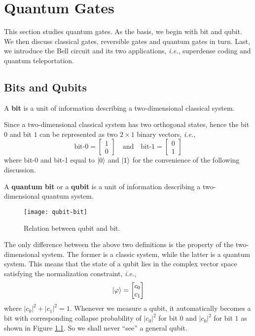 \documentclass{easyclass}
\begin{document}
\else
	\chapter{Quantum Gates}
\fi

This section studies quantum gates. As the basis, we begin with bit and qubit. We then discuss classical gates, reversible gates and quantum gates in turn. Last, we introduce the Bell circuit and its two applications, \textit{i.e.}, superdense coding and quantum teleportation.

\section{Bits and Qubits}
\label{sec:bits-and-qubits}
\begin{definition}[Bit]
	A \textbf{bit} is a unit of information describing a two-dimensional classical
	system.
\end{definition}

Since a two-dimensional classical system has two orthogonal states, hence the bit $0$ and bit $1$ can be represented as two $2\times 1$ binary vectors, \textit{i.e.},
\begin{equation}
	\textrm{bit-0}=\begin{bmatrix}1\\0 \end{bmatrix} \quad \textrm{and}\quad
	\textrm{bit-1}=\begin{bmatrix}0\\1 \end{bmatrix}
\end{equation}
where bit-0 and bit-1 equal to $\ket{0}$ and $\ket{1}$ for the convenience of the following discussion. 

\begin{definition}[Qubit]
	A \textbf{quantum bit} or a \textbf{qubit} is a unit of information describing a two- dimensional quantum system.
\end{definition}

\begin{figure}[h]
	\centering
	\texttt{[image: qubit-bit]}
	\caption{Relation between qubit and bit.}
	\label{fig:qubit-bit}
\end{figure}

The only difference between the above two definitions is the property of the two-dimensional system. The former is a classic system, while the latter is a quantum system. This means that the state of a qubit lies in the complex vector space satisfying the normalization constraint, \textit{i.e.},
\begin{equation}
	\ket{\varphi}=\begin{bmatrix}c_0\\c_1 \end{bmatrix}
\end{equation}
where $|c_0|^2+|c_1|^2=1$. Whenever we measure a qubit, it automatically becomes a bit with corresponding collapse probability of $|c_0|^2$ for bit $0$ and $|c_0|^2$ for bit $1$ as shown in Figure \ref{fig:qubit-bit}. So we shall never ``see'' a general qubit. 
\end{document}
